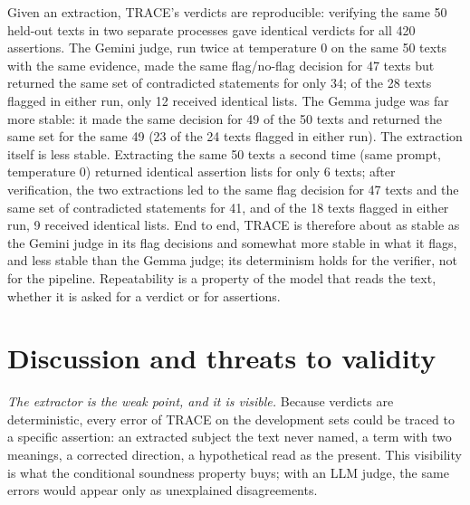 \documentclass[journal]{IEEEtran}
\renewcommand{\paragraph}[1]{\par\textit{#1}\enspace}
\begin{document}
Given an extraction, TRACE's verdicts are reproducible: verifying the same 50 held-out texts in two separate
processes gave identical verdicts for all 420 assertions. The Gemini judge, run twice at temperature 0 on the
same 50 texts with the same evidence, made the same flag/no-flag decision for 47 texts but returned the same
set of contradicted statements for only 34; of the 28 texts flagged in either run, only 12 received
identical lists. The Gemma judge was far more stable: it made the same decision for 49 of the 50 texts and
returned the same set for the same 49 (23 of the 24 texts flagged in either run). The extraction itself is
less stable. Extracting the same 50 texts a second time (same
prompt, temperature 0) returned identical assertion lists for only 6 texts; after verification, the two
extractions led to the same flag decision for 47 texts and the same set of contradicted statements for 41,
and of the 18 texts flagged in either run, 9 received identical lists. End to end, TRACE is therefore about
as stable as the Gemini judge in its flag decisions and somewhat more stable in what it flags, and less
stable than the Gemma judge; its determinism holds for the verifier, not for the pipeline. Repeatability is
a property of the model that reads the text, whether it is asked for a verdict or for assertions.

\section{Discussion and threats to validity}
\label{sec:discussion}

\paragraph{The extractor is the weak point, and it is visible.} Because verdicts are deterministic, every
error of TRACE on the development sets could be traced to a specific assertion: an extracted subject the
text never named, a term with two meanings, a corrected direction, a hypothetical read as the present.
This visibility is what the conditional soundness property buys; with an LLM judge, the same errors would
appear only as unexplained disagreements.
\end{document}
